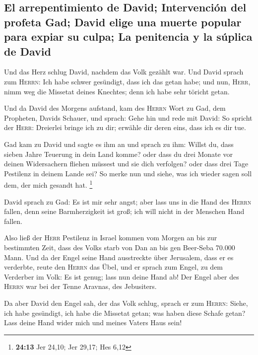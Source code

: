 \hypertarget{el-arrepentimiento-de-david-intervenciuxf3n-del-profeta-gad-david-elige-una-muerte-popular-para-expiar-su-culpa-la-penitencia-y-la-suxfaplica-de-david}{%
\subsection{El arrepentimiento de David; Intervención del profeta Gad;
David elige una muerte popular para expiar su culpa; La penitencia y la
súplica de
David}\label{el-arrepentimiento-de-david-intervenciuxf3n-del-profeta-gad-david-elige-una-muerte-popular-para-expiar-su-culpa-la-penitencia-y-la-suxfaplica-de-david}}

 Und das Herz schlug David, nachdem das Volk gezählt war.
Und David sprach zum \textsc{Herrn}: Ich habe schwer gesündigt, dass ich
das getan habe; und nun, \textsc{Herr}, nimm weg die Missetat deines
Knechtes; denn ich habe sehr töricht getan.

 Und da David des Morgens aufstand, kam des
\textsc{Herrn} Wort zu Gad, dem Propheten, Davids Schauer, und sprach:
 Gehe hin und rede mit David: So spricht der
\textsc{Herr}: Dreierlei bringe ich zu dir; erwähle dir deren eins, dass
ich es dir tue.

 Gad kam zu David und sagte es ihm an und sprach zu ihm:
Willst du, dass sieben Jahre Teuerung in dein Land komme? oder dass du
drei Monate vor deinen Widersachern fliehen müssest und sie dich
verfolgen? oder dass drei Tage Pestilenz in deinem Lande sei? So merke
nun und siehe, was ich wieder sagen soll dem, der mich gesandt hat.
\footnote{\textbf{24:13} Jer 24,10; Jer 29,17; Hes 6,12}

 David sprach zu Gad: Es ist mir sehr angst; aber lass
uns in die Hand des \textsc{Herrn} fallen, denn seine Barmherzigkeit ist
groß; ich will nicht in der Menschen Hand fallen.

 Also ließ der \textsc{Herr} Pestilenz in Israel kommen
vom Morgen an bis zur bestimmten Zeit, dass des Volks starb von Dan an
bis gen Beer-Seba 70.000 Mann.  Und da der Engel seine
Hand ausstreckte über Jerusalem, dass er es verderbte, reute den
\textsc{Herrn} das Übel, und er sprach zum Engel, zu dem Verderber im
Volk: Es ist genug; lass nun deine Hand ab! Der Engel aber des
\textsc{Herrn} war bei der Tenne Aravnas, des Jebusiters.

 Da aber David den Engel sah, der das Volk schlug, sprach
er zum \textsc{Herrn}: Siehe, ich habe gesündigt, ich habe die Missetat
getan; was haben diese Schafe getan? Lass deine Hand wider mich und
meines Vaters Haus sein!

